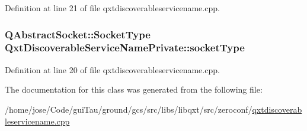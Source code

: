Definition at line 21 of file qxtdiscoverableservicename.\-cpp.

\hypertarget{class_qxt_discoverable_service_name_private_a73cdf821839df7e6521254dc689a4a05}{
\subsubsection[{socket\-Type}]{\setlength{\rightskip}{0pt plus 5cm}Q\-Abstract\-Socket\-::\-Socket\-Type Qxt\-Discoverable\-Service\-Name\-Private\-::socket\-Type}}\label{class_qxt_discoverable_service_name_private_a73cdf821839df7e6521254dc689a4a05}


Definition at line 20 of file qxtdiscoverableservicename.\-cpp.



The documentation for this class was generated from the following file\-:\begin{DoxyCompactItemize}
\item 
/home/jose/\-Code/gui\-Tau/ground/gcs/src/libs/libqxt/src/zeroconf/\hyperlink{qxtdiscoverableservicename_8cpp}{qxtdiscoverableservicename.\-cpp}\end{DoxyCompactItemize}
